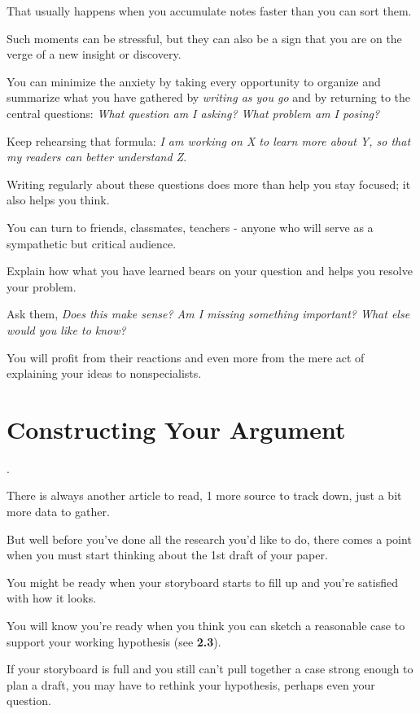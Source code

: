 \documentclass[oneside]{book}
\numberwithin{equation}{section}
\begin{document}
That usually happens when you accumulate notes faster than you can sort them.

Such moments can be stressful, but they can also be a sign that you are on the verge of a new insight or discovery.

%
You can minimize the anxiety by taking every opportunity to organize and summarize what you have gathered by \textit{writing as you go} and by returning to the central questions: \textit{What question am I asking? What problem am I posing?}

Keep rehearsing that formula: \textit{I am working on X to learn more about Y, so that my readers can better understand Z}.

Writing regularly about these questions does more than help you stay focused; it also helps you think.

%
You can turn to friends, classmates, teachers - anyone who will serve as a sympathetic but critical audience.

Explain how what you have learned bears on your question and helps you resolve your problem.

Ask them, \textit{Does this make sense? Am I missing something important? What else would you like to know?}

You will profit from their reactions and even more from the mere act of explaining your ideas to nonspecialists.


\chapter{Constructing Your Argument}

.

There is always another article to read, 1 more source to track down, just a bit more data to gather.

But well before you've done all the research you'd like to do, there comes a point when you must start thinking about the 1st draft of your paper.

You might be ready when your storyboard starts to fill up and you're satisfied with how it looks.

You will know you're ready when you think you can sketch a reasonable case to support your working hypothesis (see \textbf{2.3}).

If your storyboard is full and you still can't pull together a case strong enough to plan a draft, you may have to rethink your hypothesis, perhaps even your question.
\end{document}
